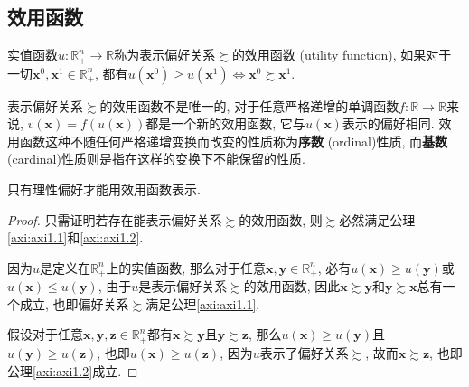\documentclass[cn, 12pt, math=mtpro2, bibstyle=apa, blue]{elegantbook}
\newcommand{\R}{\mathbb{R}}
\newcommand{\x}{\mathbf{x}}
\begin{document}
\subsection{效用函数}
\begin{definition}
实值函数$u:\R_+^n\to\R$称为表示偏好关系$\succsim$的效用函数 (utility function), 如果对于一切$\x^0, \x^1\in\R^n_+$, 都有$u(\x^0)\ge u(\x^1)\Leftrightarrow \x^0\succsim\x^1$.
\end{definition}
表示偏好关系$\succsim$的效用函数不是唯一的, 对于任意严格递增的单调函数$f:\R\to\R$来说, $v(\x)=f(u(\x))$都是一个新的效用函数, 它与$u(\x)$表示的偏好相同. 效用函数这种不随任何严格递增变换而改变的性质称为\textbf{序数} (ordinal)性质, 而\textbf{基数} (cardinal)性质则是指在这样的变换下不能保留的性质.

\begin{proposition}
只有理性偏好才能用效用函数表示.
\end{proposition}
\begin{proof}
 只需证明若存在能表示偏好关系$\succsim$的效用函数, 则$\succsim$必然满足公理\ref{axi:axi1.1}和\ref{axi:axi1.2}.

 因为$u$是定义在$\R_+^n$上的实值函数, 那么对于任意$\x,\mathbf{y}\in\R_+^n$, 必有$u(\x)\ge u(\mathbf{y})$或$u(\x)\le u(\mathbf{y})$, 由于$u$是表示偏好关系$\succsim$的效用函数, 因此$\x\succsim \mathbf{y}$和$\mathbf{y}\succsim\x$总有一个成立, 也即偏好关系$\succsim$满足公理\ref{axi:axi1.1}.

 假设对于任意$\x, \mathbf{y}, \mathbf{z}\in\R_+^n$都有$\x\succsim\mathbf{y}$且$\mathbf{y}\succsim\mathbf{z}$, 那么$u(\x)\ge u(\mathbf{y})$且$u(\mathbf{y})\ge u(\mathbf{z})$, 也即$u(\x)\ge u(\mathbf{z})$, 因为$u$表示了偏好关系$\succsim$, 故而$\x\succsim\mathbf{z}$, 也即公理\ref{axi:axi1.2}成立.
\end{proof}
\end{document}
